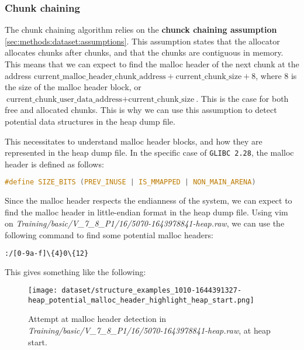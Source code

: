     \subsubsection{Chunk chaining}
    The chunk chaining algorithm relies on the \textbf{chunck chaining assumption} \ref{sec:methods:dataset:assumptions}. This assumption states that the allocator allocates chunks after chunks, and that the chunks are contiguous in memory. This means that we can expect to find the malloc header of the next chunk at the address $ \text{current\_malloc\_header\_chunk\_address} + \text{current\_chunk\_size} + 8 $, where 8 is the size of the malloc header block, or $ \text{current\_chunk\_user\_data\_address} + \text{current\_chunk\_size} $. This is the case for both free and allocated chunks. This is why we can use this assumption to detect potential data structures in the heap dump file. 
    
    This necessitates to understand malloc header blocks, and how they are represented in the heap dump file. In the specific case of \texttt{GLIBC 2.28}, the malloc header is defined as follows:

    \begin{minipage}{\dimexpr\linewidth-20pt}
        \begin{lstlisting}[language=c, caption={Malloc header definition in \texttt{GLIBC 2.28}}]
            #define SIZE_BITS (PREV_INUSE | IS_MMAPPED | NON_MAIN_ARENA)
        \end{lstlisting}
    \end{minipage}
    
    Since the malloc header respects the endianness of the system, we can expect to find the malloc header in little-endian format in the heap dump file. Using vim on \textit{Training/basic/V\_7\_8\_P1/16/5070-1643978841-heap.raw}, we can use the following command to find some potential malloc headers:

    \begin{lstlisting}[language=bash, caption={Vim command to find potential malloc headers}]
        :/[0-9a-f]\{4}0\{12}
    \end{lstlisting}
    
    This gives something like the following:

    \begin{figure}[H]
        \centering
        \texttt{[image: dataset/structure\_examples\_1010-1644391327-heap\_potential\_malloc\_header\_highlight\_heap\_start.png]}
        \caption{Attempt at malloc header detection in \textit{Training/basic/V\_7\_8\_P1/16/5070-1643978841-heap.raw}, at heap start.}
    \end{figure}

